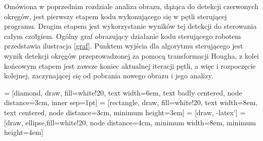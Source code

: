 
Omówiona w poprzednim rozdziale analiza obrazu, dążąca do detekcji czerwonych okręgów, jest pierwszy etapem kodu wykonującego się w pętli sterującej programu. Drugim etapem jest wykorzystanie wyników tej detekcji do sterowania całym czołgiem. Ogólny graf obrazujący działanie kodu sterującego robotem przedstawia ilustracja \ref{graf}. Punktem wyjścia dla algorytmu sterującego jest wynik detekcji okręgów przeprowadzonej za pomocą transformacji Hougha, z kolei końcowym etapem jest zawsze koniec aktualnej iteracji pętli, a więc i rozpoczęcie kolejnej, zaczynającej się od pobrania nowego obrazu i jego analizy.

 = [diamond, draw, fill=white!20, 
    text width=6em, text badly centered, node distance=3cm, inner sep=1pt]
 = [rectangle, draw, fill=white!20, 
    text width=8em, text centered, node distance=3cm, minimum height=3em]
 = [draw, -latex']
 = [draw, ellipse,fill=white!20, node distance=4cm,
    minimum width=8em, minimum height=4em]
    
